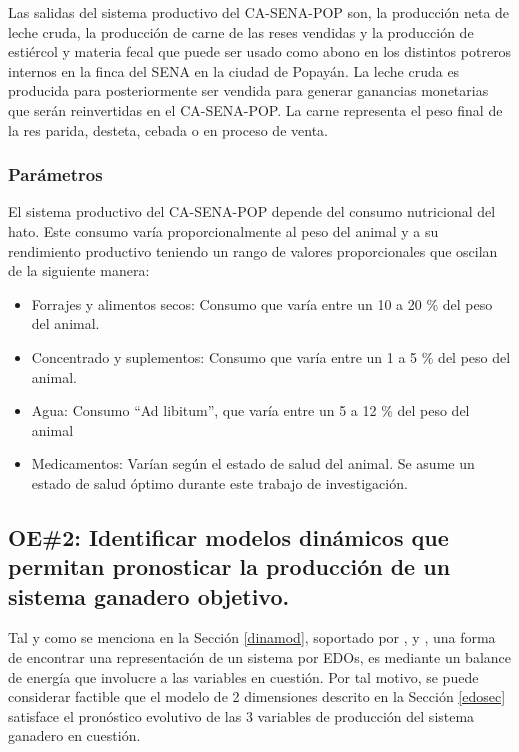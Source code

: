 Las salidas del sistema productivo del CA-SENA-POP son, la producción neta de leche cruda, la producción de carne de las reses vendidas y la producción de estiércol y materia fecal que puede ser usado como abono en los distintos potreros internos en la finca del SENA en la ciudad de Popayán. La leche cruda es producida para posteriormente ser vendida para generar ganancias monetarias que serán reinvertidas en el CA-SENA-POP. La carne representa el peso final de la res parida, desteta, cebada o en proceso de venta.

\subsubsection{Parámetros}

El sistema productivo del CA-SENA-POP depende del consumo nutricional del hato. Este consumo varía proporcionalmente al peso del animal y a su rendimiento productivo teniendo un rango de valores proporcionales que oscilan de la siguiente manera:
\begin{itemize}
    \item Forrajes y alimentos secos: Consumo que varía entre un 10 a 20 \% del peso del animal.
    \item Concentrado y suplementos: Consumo que varía entre un 1 a 5 \% del peso del animal.
    \item Agua: Consumo ``Ad libitum'', que varía entre un 5 a 12 \% del peso del animal
    \item Medicamentos: Varían según el estado de salud del animal. Se asume un estado de salud óptimo durante este trabajo de investigación.
\end{itemize}

\subsection{OE\#2: Identificar modelos dinámicos que permitan pronosticar la producción de un sistema ganadero objetivo.}

Tal y como se menciona en la Sección \ref{dinamod}, soportado por \cite{shanks}, \cite{silvestre} y \cite{iran}, una forma de encontrar una representación de un sistema por EDOs, es mediante un balance de energía que involucre a las variables en cuestión. Por tal motivo, se puede considerar factible que el modelo de 2 dimensiones descrito en la Sección \ref{edosec} satisface el pronóstico evolutivo de las 3 variables de producción del sistema ganadero en cuestión.


